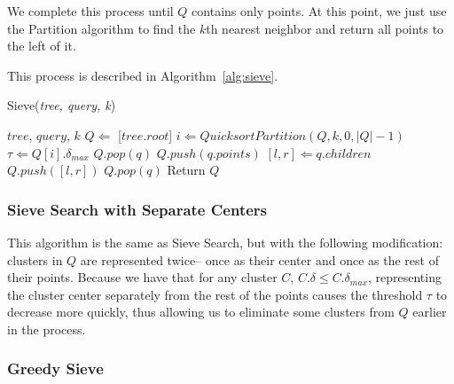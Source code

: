 We complete this process until $Q$ contains only points. At this point, we 
just use the Partition algorithm to find the $k$th 
nearest neighbor and return all points to the left of it. 

This process is described in Algorithm~\ref{alg:sieve}. 

\begin{algorithm} %
    \caption{Sieve(\emph{tree, query, k})} %
    \label{alg:sieve} %
    \begin{algorithmic} %
        \REQUIRE $tree$, $query$, $k$
        \STATE $Q \Leftarrow$ [$tree.root$]
            \STATE $i \Leftarrow QuicksortPartition(Q, k, 0, |Q| - 1)$
            \STATE $\tau \Leftarrow Q[i].\delta_{max}$
                    \STATE $Q.pop(q)$
                \ENDIF
            \ENDFOR
                    \STATE $Q.push(q.points)$
                \ELSE
                    \STATE $[l, r] \Leftarrow q.children$
                    \STATE $Q.push([l, r])$   
                \ENDIF
                \STATE $Q.pop(q)$
            \ENDFOR 
        \ENDWHILE
        \STATE Return $Q$
    \end{algorithmic}
    \end{algorithm}

\subsubsection{Sieve Search with Separate Centers}
\label{subsubsec:methods:knn-search:sieve2}
This algorithm is the same as Sieve Search, but with the following modification: clusters 
in $Q$ are represented twice-- once as their center and once as the rest of their points. 
Because we have that for any cluster $C$, $C.\delta \leq C.\delta_{max}$, representing the cluster 
center separately from the rest of the points causes the threshold $\tau$ to decrease more quickly, 
thus allowing us to eliminate some clusters from $Q$ earlier in the process. 

\subsubsection{Greedy Sieve}
\label{subsubsec:methods:knn-search:greedy-search}

